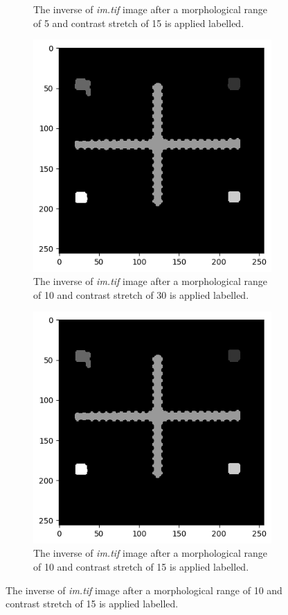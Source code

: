 \documentclass{article}
\begin{document}
\begin{figure}[htb]
\begin{subfigure}{0.4\textwidth}
  \caption{The inverse of \emph{im.tif} image after a morphological range of 5 and contrast stretch of 15 is applied labelled.}
  \label{fig:2}
\end{subfigure}\hfil 
\begin{subfigure}{0.4\textwidth}
  \includegraphics[width=\linewidth]{Report/Appendix_Images/black3.png}
  \caption{The inverse of \emph{im.tif} image after a morphological range of 10 and contrast stretch of 30 is applied labelled.}
  \label{fig:3}
\end{subfigure}
\medskip
\begin{subfigure}{0.4\textwidth}
  \includegraphics[width=\linewidth]{Report/Appendix_Images/black4.png}
  \caption{The inverse of \emph{im.tif} image after a morphological range of 10 and contrast stretch of 15 is applied labelled.}
  \label{fig:4}
\end{subfigure}\hfil 
\end{figure}
\clearpage
\end{document}
